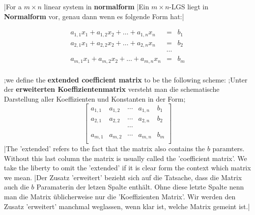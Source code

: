 \begin{tcolorbox}[colback=white]
\begin{definition}
\tr|For a  $m\times n$ linear system in \textbf{normalform} 
   |Ein $m\times n$-LGS liegt in \textbf{Normalform} vor, genau dann wenn es folgende Form hat:|

\[
\begin{array}{rcl}
a_{1,1}x_1+a_{1,2}x_2+\ldots+a_{1,n}x_n&=&b_1\\
a_{2,1}x_1+a_{2,2}x_2+\ldots+a_{2,n}x_n&=&b_2\\
&\cdots&\\
a_{m,1}x_1+a_{m,2}x_2+\ldots+a_{m,n}x_n&=&b_m\\
\end{array}
\] 
\vsp

\trx;we define the \textbf{extended coefficient matrix} to be the following scheme:
    ;Unter der \textbf{erweiterten Koeffizientenmatrix} versteht man die schematische Darstellung aller Koeffizienten und Konstanten in der Form;
\[
\left[\begin{array}{llll|l}
a_{1,1}&a_{1,2}&\cdots&a_{1,n}&b_1\\
a_{2,1}&a_{2,2}&\cdots&a_{2,n}&b_2\\
&&\cdots&&\\
a_{m,1}&a_{m,2}&\cdots&a_{m,n}&b_m\\
\end{array}\right]
\]
\tr|The 'extended' refers to the fact that the matrix also contains the $b$ paramters. Without this last column the matrix is usually called the 'coefficient matrix'.
    We take the liberty to omit the 'extended' if it is clear form the context which matrix we mean.
   |Der Zusatz 'erweitert' bezieht sich auf die Tatsache, dass die Matrix auch die $b$ Paramaterin der letzen Spalte enthält. Ohne diese letzte Spalte nenn man die Matrix
    üblicherweise nur die 'Koeffizienten Matrix'. Wir werden den Zusatz 'erweitert' manchmal weglassen, wenn klar ist, welche Matrix gemeint ist.|
\end{definition} 

\end{tcolorbox}




